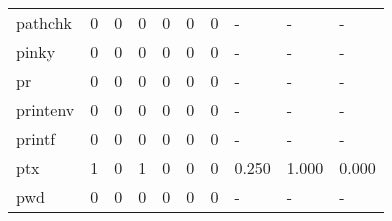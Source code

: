 \begin{longtable}{lp{1.3cm}p{1.3cm}p{1.3cm}p{1.3cm}p{1.3cm}p{1.3cm}p{1.3cm}p{1.3cm}p{1.3cm}}
pathchk   &                      0 &                                             0 &                                            0 &                                           0 &                                            0 &                                          0 &                                    - &                                      - &                                    - \\
pinky     &                      0 &                                             0 &                                            0 &                                           0 &                                            0 &                                          0 &                                    - &                                      - &                                    - \\
pr        &                      0 &                                             0 &                                            0 &                                           0 &                                            0 &                                          0 &                                    - &                                      - &                                    - \\
printenv  &                      0 &                                             0 &                                            0 &                                           0 &                                            0 &                                          0 &                                    - &                                      - &                                    - \\
printf    &                      0 &                                             0 &                                            0 &                                           0 &                                            0 &                                          0 &                                    - &                                      - &                                    - \\
ptx       &                      1 &                                             0 &                                            1 &                                           0 &                                            0 &                                          0 &                                0.250 &                                  1.000 &                                0.000 \\
pwd       &                      0 &                                             0 &                                            0 &                                           0 &                                            0 &                                          0 &                                    - &                                      - &                                    - \\

\end{longtable}
